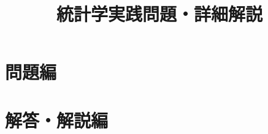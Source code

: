 \documentclass[a4paper,11pt]{jlreq}
\title{統計学実践問題・詳細解説}
\author{}
\date{}
\begin{document}
\maketitle

\section{問題編}


\newpage

\section{解答・解説編}

\end{document}
